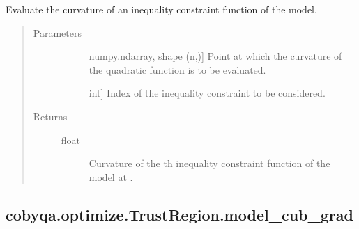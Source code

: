 \documentclass[letterpaper,10pt,english]{sphinxmanual}
\begin{document}
\begin{fulllineitems}
\begin{fulllineitems}
\label{\detokenize{refs/generated/cobyqa.optimize.TrustRegion.model_cub_curv:cobyqa.optimize.TrustRegion.model_cub_curv}}
\sphinxAtStartPar
Evaluate the curvature of an inequality constraint function of the
model.
\begin{quote}\begin{description}
\item[{Parameters}] \leavevmode\begin{description}
\item[{}] \leavevmode{[}numpy.ndarray, shape (n,){]}
\sphinxAtStartPar
Point at which the curvature of the quadratic function is to be
evaluated.

\item[{}] \leavevmode{[}int{]}
\sphinxAtStartPar
Index of the inequality constraint to be considered.

\end{description}

\item[{Returns}] \leavevmode\begin{description}
\item[{float}] \leavevmode
\sphinxAtStartPar
Curvature of the \sphinxhyphen{}th inequality constraint function of the model
at .

\end{description}

\end{description}\end{quote}

\end{fulllineitems}



\subsection{cobyqa.optimize.TrustRegion.model\_cub\_grad}
\label{\detokenize{refs/generated/cobyqa.optimize.TrustRegion.model_cub_grad:cobyqa-optimize-trustregion-model-cub-grad}}\label{\detokenize{refs/generated/cobyqa.optimize.TrustRegion.model_cub_grad::doc}}


\end{fulllineitems}
\end{document}

